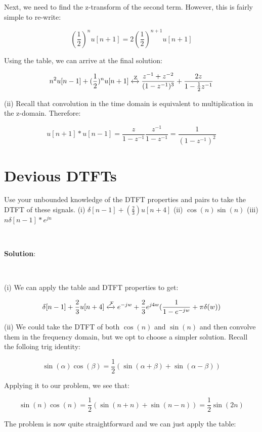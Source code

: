 \documentclass{article}
\begin{document}
\noindent Next, we need to find the z-transform of the second term. However, this is fairly simple to re-write:

$$(\frac{1}{2})^nu[n+1] = 2 (\frac{1}{2})^{n+1}u[n+1]$$

\noindent Using the table, we can arrive at the final solution:

$$n^2 u[n-1] + (\frac{1}{2})^n u[n+1] \xleftrightarrow{\text{Z}} \frac{z^{-1} + z^{-2}}{(1-z^{-1})^3} + \frac{2z}{1-\frac{1}{2}z^{-1}}$$

\noindent (ii) Recall that convolution in the time domain is equivalent to multiplication in the z-domain. Therefore:

$$u[n+1] * u[n-1] = \frac{z}{1-z^{-1}} \frac{z^{-1}}{1-z^{-1}} = \frac{1}{(1-z^{-1})^2}$$

\newpage

\section{Devious DTFTs}
Use your unbounded knowledge of the DTFT properties and pairs to take the DTFT of these signals.
\newline\newline
(i) $\delta[n-1] + (\frac{2}{3})u[n+4]$
\newline\newline
(ii) $\cos(n)\sin(n)$
\newline\newline
(iii) $n\delta[n-1]*e^{jn}$

\

\noindent \textbf{Solution}: 

\

\noindent (i) We can apply the table and DTFT properties to get:

$$\delta[n-1] + \frac{2}{3}u[n+4] \xleftrightarrow{\mathcal{F}} e^{-jw} + \frac{2}{3}e^{j4w}(\frac{1}{1-e^{-jw}} + \pi \delta(w))$$

\noindent (ii) We could take the DTFT of both $\cos(n)$ and $\sin(n)$ and then convolve them in the frequency domain, but we opt to choose a simpler solution. Recall the folloing trig identity:

$$\sin(\alpha)\cos(\beta) = \frac{1}{2}(\sin(\alpha + \beta) + \sin(\alpha-\beta))$$

\noindent Applying it to our problem, we see that:

$$\sin(n)\cos(n) = \frac{1}{2}(\sin(n + n) + \sin(n-n)) = \frac{1}{2}\sin(2n)$$

\noindent The problem is now quite straightforward and we can just apply the table:
\end{document}
